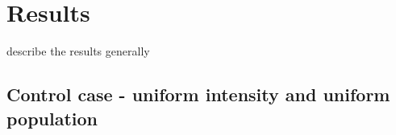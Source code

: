 
\section{Results}

describe the results generally

\subsection{Control case - uniform intensity and uniform population}